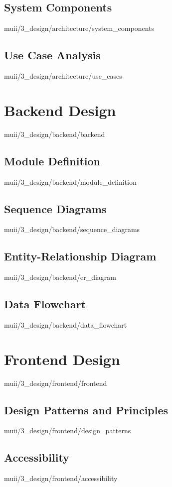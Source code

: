 \documentclass[english,epsbased,copyright,final,printable,covers,extendedindex,firstnumbered,tfm,gnuplot,loc,lof,lot]{tfgtfmthesisuam}
\begin{document}
      \subsection{System Components\label{SS:SYSCOMPS}}{muii/3_design/architecture/system_components}
      \subsection{Use Case Analysis\label{SS:USECASEDIAG}}{muii/3_design/architecture/use_cases}

    \section{Backend Design\label{SEC:BACKDESIGN}}{muii/3_design/backend/backend}
      \subsection{Module Definition\label{SS:MODULEDEF}}{muii/3_design/backend/module_definition}
      \subsection{Sequence Diagrams\label{SS:SEQUENCEDIAG}}{muii/3_design/backend/sequence_diagrams}
      \subsection{Entity-Relationship Diagram\label{SS:DATABASEDIAG}}{muii/3_design/backend/er_diagram}
      \subsection{Data Flowchart\label{SS:DATAFLOW}}{muii/3_design/backend/data_flowchart}

    \section{Frontend Design\label{SEC:FRONTDESIGN}}{muii/3_design/frontend/frontend}
      \subsection{Design Patterns and Principles\label{SS:PATTPRINC}}{muii/3_design/frontend/design_patterns}
      \subsection{Accessibility\label{SS:ACCESSIBILITY}}{muii/3_design/frontend/accessibility}
\end{document}
